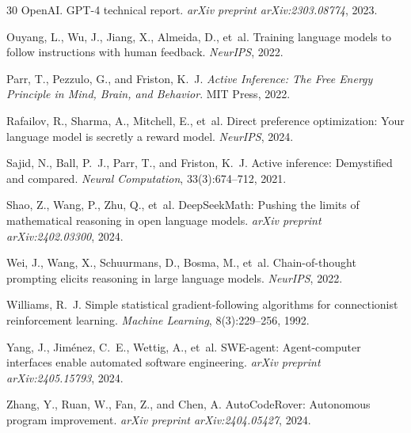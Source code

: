 \documentclass[11pt]{article}
\begin{document}
\begin{thebibliography}{30}
OpenAI.
\newblock GPT-4 technical report.
\newblock \emph{arXiv preprint arXiv:2303.08774}, 2023.

Ouyang, L., Wu, J., Jiang, X., Almeida, D., et~al.
\newblock Training language models to follow instructions with human feedback.
\newblock \emph{NeurIPS}, 2022.

Parr, T., Pezzulo, G., and Friston, K.~J.
\newblock \emph{Active Inference: The Free Energy Principle in Mind, Brain, and
  Behavior}.
\newblock MIT Press, 2022.

Rafailov, R., Sharma, A., Mitchell, E., et~al.
\newblock Direct preference optimization: Your language model is secretly a
  reward model.
\newblock \emph{NeurIPS}, 2024.

Sajid, N., Ball, P.~J., Parr, T., and Friston, K.~J.
\newblock Active inference: Demystified and compared.
\newblock \emph{Neural Computation}, 33(3):674--712, 2021.

Shao, Z., Wang, P., Zhu, Q., et~al.
\newblock DeepSeekMath: Pushing the limits of mathematical reasoning in open
  language models.
\newblock \emph{arXiv preprint arXiv:2402.03300}, 2024.

Wei, J., Wang, X., Schuurmans, D., Bosma, M., et~al.
\newblock Chain-of-thought prompting elicits reasoning in large language models.
\newblock \emph{NeurIPS}, 2022.

Williams, R.~J.
\newblock Simple statistical gradient-following algorithms for connectionist
  reinforcement learning.
\newblock \emph{Machine Learning}, 8(3):229--256, 1992.

Yang, J., Jim{\'e}nez, C.~E., Wettig, A., et~al.
\newblock SWE-agent: Agent-computer interfaces enable automated software
  engineering.
\newblock \emph{arXiv preprint arXiv:2405.15793}, 2024.

Zhang, Y., Ruan, W., Fan, Z., and Chen, A.
\newblock AutoCodeRover: Autonomous program improvement.
\newblock \emph{arXiv preprint arXiv:2404.05427}, 2024.

\end{thebibliography}
\end{document}
